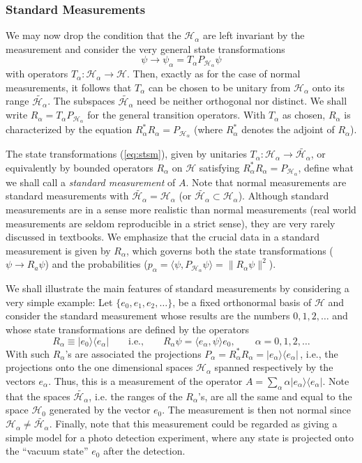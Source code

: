 \documentclass[12pt]{article}
\renewcommand{\a}{\alpha}
\newcommand{\psia}{\psi_{\a}}
\newcommand{\Ha}{{\H}_{\a}}
\renewcommand{\H}{\mbox{$\mathcal{H}$}}
\newcommand{\Pa}{ P_{ {\mathcal{H}_{\a} } } }
\newcommand{\Aa}{R_{\a}}
\newcommand{\norm}{\|}
\begin{document}
\subsubsection{Standard Measurements}
\label{sec:SM}
We may now drop the condition that the $\Ha$ are left invariant by the
measurement and consider the very general state transformations
\begin{equation}
\psi \to \psia=T_\a \Pa \psi
\label{eq:stsm}
\end{equation}
with operators $T_\a : \Ha\to\H$. Then, exactly as for the case of
normal measurements, it follows that $T_\a$ can be chosen to be
unitary {}from $\Ha$ onto its range $\widetilde{\Ha}$.  The subspaces
$\widetilde{\Ha}$ need be neither orthogonal nor distinct. We shall
write $R_\a=T_\a \Pa$ for the general transition operators. With
$T_\a$ as chosen, $R_\a$ is characterized by the equation
$\Aa^{\ast}\Aa = \Pa$ (where $\Aa^{\ast}$ denotes the adjoint of
$\Aa$).


The state transformations (\ref{eq:stsm}), given by unitaries $T_\a:
\Ha\to\widetilde{\Ha}$, or equivalently by bounded operators $R_\a$ on
$\H$ satisfying $\Aa^{\ast}\Aa = \Pa$, define what we shall call a
\emph{standard measurement} of $A$.  Note that normal measurements are
standard measurements with $\widetilde{\Ha}=\Ha$ (or $
\widetilde{\Ha}\subset \Ha$).  Although standard measurements are in a
sense more realistic than normal measurements (real world measurements
are seldom reproducible in a strict sense), they are very rarely
discussed in textbooks. We emphasize that the crucial data in a
standard measurement is given by $R_\a$, which governs both the state
transformations ($\psi\to R_a\psi$) and the probabilities ($p_\a =
\langle\psi, \Pa\psi\rangle= \norm R_\a\psi\norm^2$).

We shall illustrate the main features of standard measurements by
considering a very simple example: Let $\{e_0, e_{1}, e_{2}, \ldots
\}$, be a fixed orthonormal basis of \H{} and consider the standard
measurement whose results are the numbers $0,1,2,\ldots $ and whose
state transformations are defined by the operators
\begin{displaymath}
\Aa\equiv |e_0\rangle\langle e_\a| \qquad \mbox{i.e.,}\qquad
R_{\a} \psi = \langle e_\a, \psi \rangle
e_{0},\qquad\a=0,1,2,\ldots
\end{displaymath}
With such $\Aa$'s are associated the projections
$P_{\a}=\Aa^{\ast}\Aa=|e_\a\rangle\langle e_\a|\,$, i.e., the
projections onto the one dimensional spaces $\Ha$ spanned respectively
by the vectors $e_{\a}$.  Thus, this is a measurement of the operator
$ A = \sum_{\a} \a |e_\a\rangle\langle e_\a| $.  Note that the spaces
$\widetilde{\Ha}$, i.e.  the ranges of the $\Aa$'s, are all the same
and equal to the space $\H_{0}$ generated by the vector $e_0$. The
measurement is then not normal since $\Ha\neq \widetilde{\Ha}$.
Finally, note that this measurement could be regarded as giving a
simple model for a photo detection experiment, where any state is
projected onto the ``vacuum state'' $e_0$ after the detection.
\end{document}
